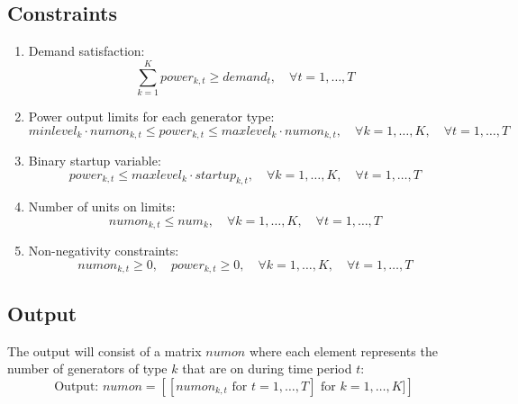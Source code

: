 \documentclass{article}
\begin{document}
\subsection*{Constraints}

\begin{enumerate}
    \item Demand satisfaction:
    \[
    \sum_{k=1}^{K} power_{k,t} \geq demand_t, \quad \forall t = 1, \ldots, T
    \]

    \item Power output limits for each generator type:
    \[
    minlevel_k \cdot numon_{k,t} \leq power_{k,t} \leq maxlevel_k \cdot numon_{k,t}, \quad \forall k = 1, \ldots, K, \quad \forall t = 1, \ldots, T
    \]

    \item Binary startup variable:
    \[
    power_{k,t} \leq maxlevel_k \cdot startup_{k,t}, \quad \forall k = 1, \ldots, K, \quad \forall t = 1, \ldots, T
    \]

    \item Number of units on limits:
    \[
    numon_{k,t} \leq num_k, \quad \forall k = 1, \ldots, K, \quad \forall t = 1, \ldots, T
    \]

    \item Non-negativity constraints:
    \[
    numon_{k,t} \geq 0, \quad power_{k,t} \geq 0, \quad \forall k = 1, \ldots, K, \quad \forall t = 1, \ldots, T
    \]

\end{enumerate}

\subsection*{Output}
The output will consist of a matrix $numon$ where each element represents the number of generators of type $k$ that are on during time period $t$:
\[
\text{Output: } 
numon = \left[ [numon_{k, t} \text{ for } t = 1, \ldots, T] \text{ for } k = 1, \ldots, K] \right]
\]
\end{document}
